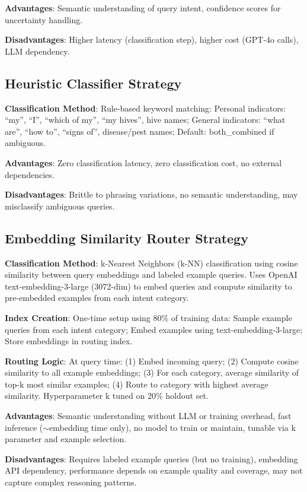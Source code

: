 \documentclass[twocolumn,10pt]{article}
\begin{document}
\textbf{Advantages}: Semantic understanding of query intent, confidence scores for uncertainty handling.

\textbf{Disadvantages}: Higher latency (classification step), higher cost (GPT-4o calls), LLM dependency.

\subsection{Heuristic Classifier Strategy}

\textbf{Classification Method}: Rule-based keyword matching: Personal indicators: ``my'', ``I'', ``which of my'', ``my hives'', hive names; General indicators: ``what are'', ``how to'', ``signs of'', disease/pest names; Default: both\_combined if ambiguous.

\textbf{Advantages}: Zero classification latency, zero classification cost, no external dependencies.

\textbf{Disadvantages}: Brittle to phrasing variations, no semantic understanding, may misclassify ambiguous queries.

\subsection{Embedding Similarity Router Strategy}

\textbf{Classification Method}: k-Nearest Neighbors (k-NN) classification using cosine similarity between query embeddings and labeled example queries. Uses OpenAI text-embedding-3-large (3072-dim) to embed queries and compute similarity to pre-embedded examples from each intent category.

\textbf{Index Creation}: One-time setup using 80\% of training data: Sample example queries from each intent category; Embed examples using text-embedding-3-large; Store embeddings in routing index.

\textbf{Routing Logic}: At query time: (1) Embed incoming query; (2) Compute cosine similarity to all example embeddings; (3) For each category, average similarity of top-k most similar examples; (4) Route to category with highest average similarity. Hyperparameter k tuned on 20\% holdout set.

\textbf{Advantages}: Semantic understanding without LLM or training overhead, fast inference ($\sim$embedding time only), no model to train or maintain, tunable via k parameter and example selection.

\textbf{Disadvantages}: Requires labeled example queries (but no training), embedding API dependency, performance depends on example quality and coverage, may not capture complex reasoning patterns.
\end{document}
